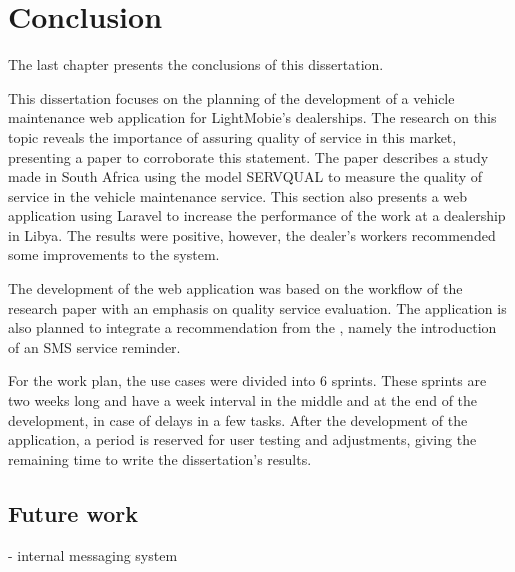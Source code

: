 \chapter{Conclusion}%
\label{chapter:conclusion}

\begin{introduction}
The last chapter presents the conclusions of this dissertation.
\end{introduction} 


This dissertation focuses on the planning of the development of a vehicle maintenance web application for LightMobie's dealerships. 
The research on this topic reveals the importance of assuring quality of service in this market, presenting a paper to corroborate this statement.
The paper describes a study made in South Africa using the model SERVQUAL to measure the quality of service in the vehicle maintenance service.
This section also presents a web application using Laravel to increase the performance of the work at a dealership in Libya. 
The results were positive, however, the dealer's workers recommended some improvements to the system.

The development of the web application was based on the workflow of the research paper with an emphasis on quality service evaluation.
The application is also planned to integrate a recommendation from the \citet{MAS_MOTORS}, namely the introduction of an SMS service reminder. 

For the work plan, the use cases were divided into 6 sprints. 
These sprints are two weeks long and have a week interval in the middle and at the end of the development, in case of delays in a few tasks.
After the development of the application, a period is reserved for user testing and adjustments, giving the remaining time to write the dissertation's results.


\section{Future work}

- internal messaging system
